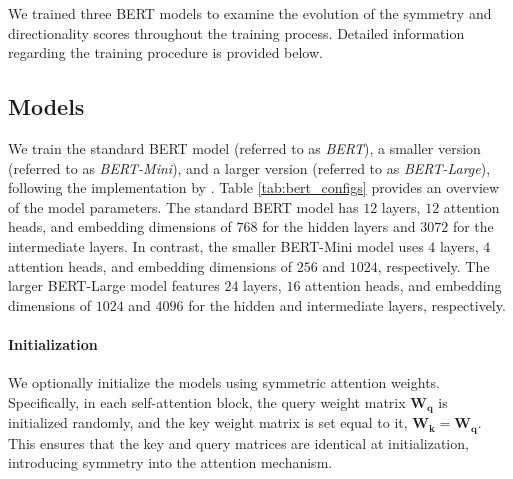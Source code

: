 We trained three BERT models \citep{devlinBERTPretrainingDeep2019} to examine the evolution of the symmetry and directionality scores throughout the training process. Detailed information regarding the training procedure is provided below.

\subsection{Models}\label{sec:exp_bertmodels_models}
%


We train the standard BERT model (referred to as \emph{BERT}), a smaller version (referred to as \emph{BERT-Mini}), and a larger version (referred to as \emph{BERT-Large}), following the implementation by \citep{devlinBERTPretrainingDeep2019}. 
Table \ref{tab:bert_configs} provides an overview of the model parameters. 
The standard BERT model has $12$ layers, $12$ attention heads, and embedding dimensions of $768$ for the hidden layers and $3072$ for the intermediate layers. In contrast, the smaller BERT-Mini model uses $4$ layers, $4$ attention heads, and embedding dimensions of $256$ and $1024$, respectively.
The larger BERT-Large model features $24$ layers, $16$ attention heads, and embedding dimensions of $1024$ and $4096$ for the hidden and intermediate layers, respectively.

\paragraph{Initialization}
We optionally initialize the models using symmetric attention weights. Specifically, in each self-attention block, the query weight matrix $\bm{W_q}$ is initialized randomly, and the key weight matrix is set equal to it, $\bm{W_k} = \bm{W_q}$. This ensures that the key and query matrices are identical at initialization, introducing symmetry into the attention mechanism.

